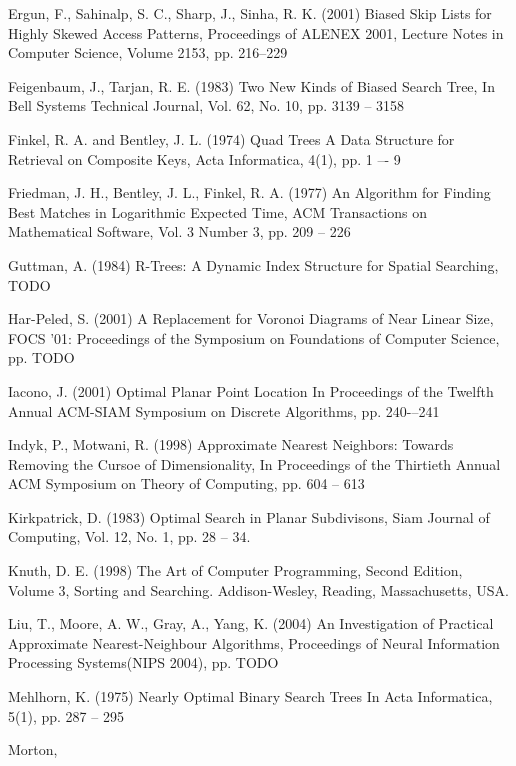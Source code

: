 \documentclass[mcs]{scsthesis}
\begin{document}
\begin{thebibliography}{5}
Ergun, F., Sahinalp, S. C., Sharp, J., Sinha, R. K. (2001) Biased Skip Lists
for Highly Skewed Access Patterns, Proceedings of ALENEX 2001, Lecture Notes in
Computer Science, Volume 2153, pp. 216--229 

Feigenbaum, J., Tarjan, R. E. (1983) Two New Kinds of Biased Search Tree,
In Bell Systems Technical Journal, Vol. 62, No. 10, pp. 3139 -- 3158

Finkel, R. A. and Bentley, J. L. (1974) Quad Trees A Data Structure for
Retrieval on Composite Keys, Acta Informatica, 4(1), pp. 1 –- 9 

Friedman, J. H., Bentley, J. L., Finkel, R. A. (1977) An Algorithm for Finding
Best Matches in Logarithmic Expected Time, ACM Transactions on Mathematical
Software, Vol. 3 Number 3, pp. 209 -- 226

Guttman, A. (1984) R-Trees: A Dynamic Index Structure for Spatial Searching,
TODO 

Har-Peled, S. (2001) A Replacement for Voronoi Diagrams of Near Linear Size, 
FOCS '01: Proceedings of the Symposium on Foundations of Computer Science, 
pp. TODO

Iacono, J. (2001) Optimal Planar Point Location
In Proceedings of the Twelfth Annual ACM-SIAM Symposium on Discrete Algorithms,
pp. 240-–241

Indyk, P., Motwani, R. (1998) Approximate Nearest Neighbors: Towards Removing
the Cursoe of Dimensionality, In Proceedings of the Thirtieth Annual ACM
Symposium on Theory of Computing, pp. 604 -- 613 

Kirkpatrick, D. (1983) Optimal Search in Planar Subdivisons,
Siam Journal of Computing, Vol. 12, No. 1, pp. 28 -- 34.

Knuth, D. E. (1998) The Art of Computer Programming, Second Edition,
Volume 3, Sorting and Searching.  Addison-Wesley, Reading, Massachusetts, USA.

Liu, T., Moore, A. W., Gray, A., Yang, K. (2004) An Investigation of Practical
Approximate Nearest-Neighbour Algorithms, Proceedings of Neural Information
Processing Systems(NIPS 2004), pp. TODO  

Mehlhorn, K. (1975) Nearly Optimal Binary Search Trees 
In Acta Informatica, 5(1), pp. 287 – 295

Morton, %


\end{thebibliography}
\end{document}
